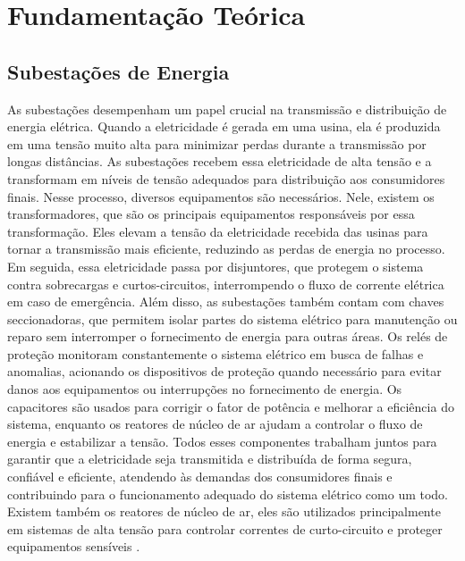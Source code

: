 \chapter{Fundamentação Teórica}

\section{Subestações de Energia}
\label{sec:subestacao}

As subestações desempenham um papel crucial na transmissão e distribuição de energia elétrica. Quando a eletricidade é gerada em uma usina, ela é produzida em uma tensão muito alta para minimizar perdas durante a transmissão por longas distâncias. As subestações recebem essa eletricidade de alta tensão e a transformam em níveis de tensão adequados para distribuição aos consumidores finais. Nesse processo, diversos equipamentos são necessários. Nele, existem os transformadores, que são os principais equipamentos responsáveis por essa transformação. Eles elevam a tensão da eletricidade recebida das usinas para tornar a transmissão mais eficiente, reduzindo as perdas de energia no processo. Em seguida, essa eletricidade passa por disjuntores, que protegem o sistema contra sobrecargas e curtos-circuitos, interrompendo o fluxo de corrente elétrica em caso de emergência. Além disso, as subestações também contam com chaves seccionadoras, que permitem isolar partes do sistema elétrico para manutenção ou reparo sem interromper o fornecimento de energia para outras áreas. Os relés de proteção monitoram constantemente o sistema elétrico em busca de falhas e anomalias, acionando os dispositivos de proteção quando necessário para evitar danos aos equipamentos ou interrupções no fornecimento de energia. Os capacitores são usados para corrigir o fator de potência e melhorar a eficiência do sistema, enquanto os reatores de núcleo de ar ajudam a controlar o fluxo de energia e estabilizar a tensão. Todos esses componentes trabalham juntos para garantir que a eletricidade seja transmitida e distribuída de forma segura, confiável e eficiente, atendendo às demandas dos consumidores finais e contribuindo para o funcionamento adequado do sistema elétrico como um todo. Existem também os reatores de núcleo de ar, eles são utilizados principalmente em sistemas de alta tensão para controlar correntes de curto-circuito e proteger equipamentos sensíveis \cite{sen2021principles}.


